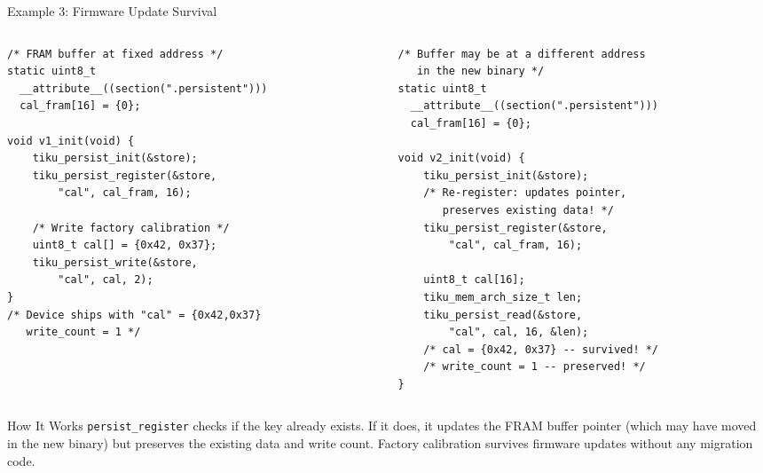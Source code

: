 \documentclass[aspectratio=169, 10pt]{beamer}
\begin{document}
\begin{frame}[fragile]{Example 3: Firmware Update Survival}
\begin{columns}[T]
\begin{column}{0.48\textwidth}
\begin{lstlisting}[style=cstyle, title={Firmware v1.0}]
/* FRAM buffer at fixed address */
static uint8_t
  __attribute__((section(".persistent")))
  cal_fram[16] = {0};

void v1_init(void) {
    tiku_persist_init(&store);
    tiku_persist_register(&store,
        "cal", cal_fram, 16);

    /* Write factory calibration */
    uint8_t cal[] = {0x42, 0x37};
    tiku_persist_write(&store,
        "cal", cal, 2);
}
/* Device ships with "cal" = {0x42,0x37}
   write_count = 1 */
\end{lstlisting}
\end{column}

\begin{column}{0.48\textwidth}
\begin{lstlisting}[style=cstyle, title={Firmware v2.0 (reflashed)}]
/* Buffer may be at a different address
   in the new binary */
static uint8_t
  __attribute__((section(".persistent")))
  cal_fram[16] = {0};

void v2_init(void) {
    tiku_persist_init(&store);
    /* Re-register: updates pointer,
       preserves existing data! */
    tiku_persist_register(&store,
        "cal", cal_fram, 16);

    uint8_t cal[16];
    tiku_mem_arch_size_t len;
    tiku_persist_read(&store,
        "cal", cal, 16, &len);
    /* cal = {0x42, 0x37} -- survived! */
    /* write_count = 1 -- preserved! */
}
\end{lstlisting}
\end{column}
\end{columns}

\vspace{0.3em}
\begin{block}{How It Works}
\texttt{persist\_register} checks if the key already exists. If it does,
it updates the FRAM buffer pointer (which may have moved in the new binary)
but preserves the existing data and write count. Factory calibration
survives firmware updates without any migration code.
\end{block}
\end{frame}
\end{document}
